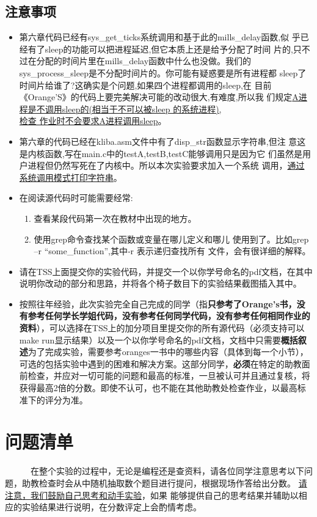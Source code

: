 \documentclass[a4paper]{article}
\begin{document}
\subsection{注意事项}
	\begin{itemize}
		\item 第六章代码已经有sys\_get\_ticks系统调用和基于此的mills\_delay函数,似
乎已经有了sleep的功能可以把进程延迟,但它本质上还是给予分配了时间 片的,只不过在分配的时间片里在mills\_delay函数中什么也没做。我们的 sys\_process\_sleep是不分配时间片的。你可能有疑惑要是所有进程都 sleep了时间片给谁了?这确实是个问题,如果四个进程都调用的sleep,在 目前《Orange’S》的代码上要完美解决可能的改动很大,有难度,所以我 们规定\underline{A进程是不调用sleep的(相当于不可以被sleep 的系统进程),} \\ \underline{检查 作业时不会要求A进程调用sleep}。
		\item 第六章的代码已经在kliba.asm文件中有了disp\_str函数显示字符串,但注 意这是内核函数,写在main.c中的testA,testB,testC能够调用只是因为它
们虽然是用户进程但仍然写死在了内核中。所以本次实验要求加入一个系统 调用，\underline{通过系统调用模式打印字符串}。
		\item 在阅读源代码时可能需要经常:
		\begin{enumerate}
			\item 查看某段代码第一次在教材中出现的地方。
			\item 使用grep命令查找某个函数或变量在哪儿定义和哪儿 使用到了。比如grep –r “some\_function”,其中‐r 表示递归查找所有 文件，会有很详细的解释。
		\end{enumerate}
		\item 请在TSS上面提交你的实验代码，并提交一个以你学号命名的pdf文档，在其中说明你改动的部分和思路，并将各个椅子数目下的实验结果截图插入其中。
		\item 按照往年经验，此次实验完全自己完成的同学（指\textbf{只参考了Orange's书，没有参考任何学长学姐代码，没有参考任何同学代码，没有参考任何相同作业的资料}），可以选择在TSS上的加分项目里提交你的所有源代码（必须支持可以make run显示结果）以及一个以你学号命名的pdf文档，文档中只需要\textbf{概括叙述}为了完成实验，需要参考oranges一书中的哪些内容（具体到每一个小节），可选的包括实验中遇到的困难和解决方案。这部分同学，\textbf{必须}在特定的助教面前检查，并应对一切可能的问题和最高的标准，一旦被认可并且通过复核，将获得最高2倍的分数。即使不认可，也不能在其他助教处检查作业，以最高标准下的评分为准。
	\end{itemize}

\section{问题清单}
~~~~~~在整个实验的过程中，无论是编程还是查资料，请各位同学注意思考以下问题，助教检查时会从中随机抽取数个题目进行提问，根据现场作答给出分数。
\underline{请注意，我们鼓励自己思考和动手实验}，如果
能够提供自己的思考结果并辅助以相应的实验结果进行说明，在分数评定上会酌情考虑。
\end{document}
